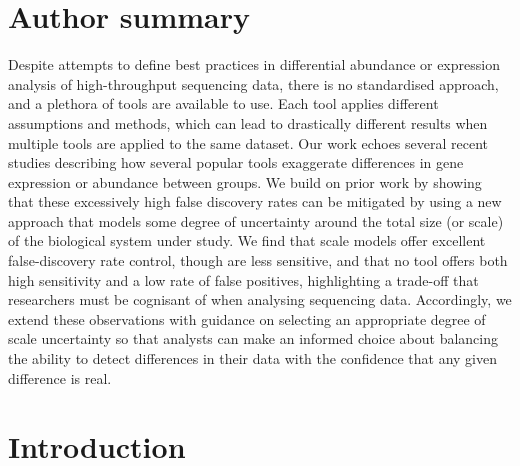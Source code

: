\documentclass[10pt,letterpaper]{article}
\begin{document}

%
\section*{Author summary}
Despite attempts to define best practices in differential abundance or expression analysis of high-throughput sequencing data, there is no standardised approach, and a plethora of tools are available to use. Each tool applies different assumptions and methods, which can lead to drastically different results when multiple tools are applied to the same dataset. Our work echoes several recent studies describing how several popular tools exaggerate differences in gene expression or abundance between groups. We build on prior work by showing that these excessively high false discovery rates can be mitigated by using a new approach that models some degree of uncertainty around the total size (or scale) of the biological system under study. We find that scale models offer excellent false-discovery rate control, though are less sensitive, and that no tool offers both high sensitivity and a low rate of false positives, highlighting a trade-off that researchers must be cognisant of when analysing sequencing data. Accordingly, we extend these observations with guidance on selecting an appropriate degree of scale uncertainty so that analysts can make an informed choice about balancing the ability to detect differences in their data with the confidence that any given difference is real.

\linenumbers


\section*{Introduction}
\end{document}
